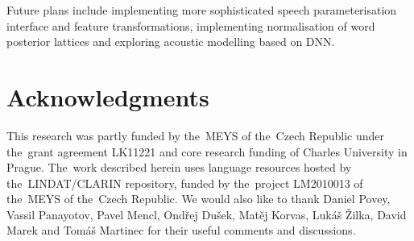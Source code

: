 Future plans include implementing more sophisticated speech parameterisation interface and feature transformations, implementing normalisation of word posterior lattices and exploring acoustic modelling based on \acl{DNN}.

\section*{Acknowledgments}
This research was partly funded by the~MEYS of the~Czech Republic under the~grant agreement LK11221 and core research funding of Charles University in Prague.
The~work described herein uses language resources hosted by the~LINDAT/CLARIN repository, funded by the~project LM2010013 of the~MEYS of the~Czech Republic.
We would also like to thank Daniel Povey, Vassil Panayotov, Pavel Mencl, Ondřej Dušek, Matěj Korvas, Lukáš Žilka, David Marek and Tomáš Martinec for their useful comments and discussions.
